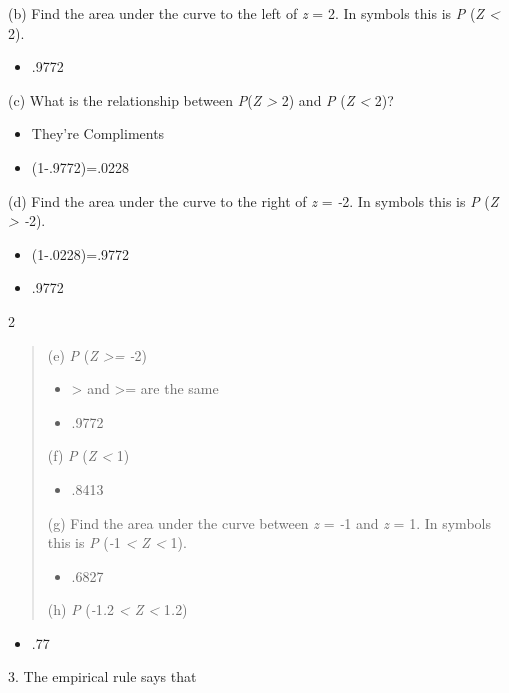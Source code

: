 \documentclass{article}
\begin{document}
(b) Find the area under the curve to the left of \emph{z} = 2. In
symbols this is \emph{P} (\emph{Z \textless{}} 2).
\begin{itemize}
    \item .9772
\end{itemize}
(c) What is the relationship between \emph{P}(\emph{Z \textgreater{}} 2)
and \emph{P} (\emph{Z \textless{}} 2)?
\begin{itemize}
    \item They're Compliments
    \item (1-.9772)=.0228
\end{itemize}
(d) Find the area under the curve to the right of \emph{z} = \emph{-}2.
In symbols this is \emph{P} (\emph{Z \textgreater{} -}2).
\begin{itemize}
    \item (1-.0228)=.9772
    \item .9772
\end{itemize}
2

\begin{quote}
(e) \emph{P} (\emph{Z >= -}2)
\begin{itemize}
    \item > and >= are the same
    \item .9772
\end{itemize}
(f) \emph{P} (\emph{Z \textless{}} 1)
\begin{itemize}
    \item .8413
\end{itemize}
(g) Find the area under the curve between \emph{z} = \emph{-}1 and
\emph{z} = 1. In symbols this is \emph{P} (\emph{-}1 \emph{\textless{} Z
\textless{}} 1).
\begin{itemize}
    \item .6827
\end{itemize}
(h) \emph{P} (\emph{-}1\emph{.}2 \emph{\textless{} Z \textless{}}
1\emph{.}2)
\end{quote}
\begin{itemize}
    \item .77
\end{itemize}
3. The empirical rule says that
\end{document}
